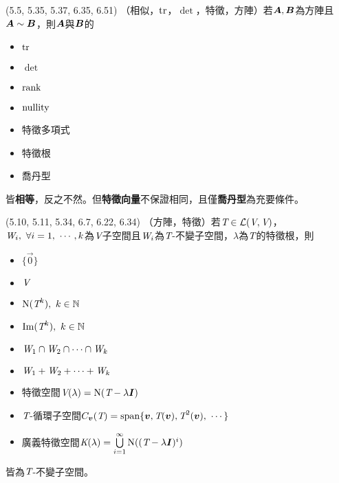 \item \begin{theorem}{(5.5, 5.35, 5.37, 6.35, 6.51)} （相似，$\operatorname{tr}$，$\det$，特徵，方陣）若$\boldsymbol{A}, \boldsymbol{B}$為方陣且$\boldsymbol{A} \sim \boldsymbol{B}$，則$\boldsymbol{A}$與$\boldsymbol{B}$的
	\begin{itemize}
		\item $\operatorname{tr}$
		\item $\det$
		\item $\operatorname{rank}$
		\item $\operatorname{nullity}$
		\item 特徵多項式
		\item 特徵根
		\item 喬丹型
	\end{itemize}
	皆\textbf{相等}，反之不然。但\textbf{特徵向量}不保證相同，且僅\textbf{喬丹型}為充要條件。
\end{theorem}

\item \begin{theorem}{(5.10, 5.11, 5.34, 6.7, 6.22, 6.34)} （方陣，特徵）若$\textit{T} \in \mathcal{L}(\textit{V}, \textit{V})$，$\spc{W}_i, \ \forall i = 1, \ \cdots, k$為$\textit{V}$子空間且$\textit{W}_i$為$\textit{T}$-不變子空間，$\lambda$為$\textit{T}$的特徵根，則
	\begin{itemize}
		\item $\{\vec{0}\}$
		\item $\textit{V}$
		\item $\operatorname{N}(\textit{T}^k), \ k \in \mathbb{N}$
		\item $\operatorname{Im}(\textit{T}^k), \ k \in \mathbb{N}$
		\item $\textit{W}_1 \cap \textit{W}_2 \cap \cdots \cap \textit{W}_k$
		\item $\textit{W}_1 + \textit{W}_2 + \cdots + \textit{W}_k$
		\item 特徵空間$\textit{V}(\lambda) = \operatorname{N}(\textit{T} - \lambda\boldsymbol{I})$
		\item $\textit{T}$-循環子空間$C_{\boldsymbol{v}}(\textit{T}) = \operatorname{span}\{\boldsymbol{v}, \textit{T}(\boldsymbol{v}), \textit{T}^2(\boldsymbol{v}), \ \cdots\}$
		\item 廣義特徵空間$\textit{K}(\lambda) = \bigcup\limits_{i = 1}^{\infty}\operatorname{N}((\textit{T} - \lambda\boldsymbol{I})^i)$
	\end{itemize}
	皆為$\textit{T}$-不變子空間。
\end{theorem}


